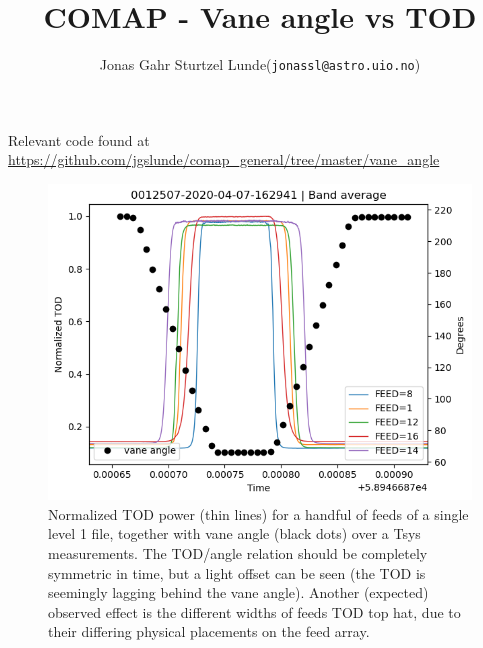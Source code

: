 \documentclass[10pt, a4paper]{article}
\begin{document}
\title{COMAP - Vane angle vs TOD}
\author{
    \begin{tabular}{r l}
        Jonas Gahr Sturtzel Lunde & (\texttt{jonassl@astro.uio.no})
    \end{tabular}}
\maketitle
Relevant code found at \url{https://github.com/jgslunde/comap_general/tree/master/vane_angle}
\vspace{0.7cm}


\begin{figure}[h!]
    \centering
    \includegraphics[scale=0.6]{../tod_angle.png}
    \caption{Normalized TOD power (thin lines) for a handful of feeds of a single level 1 file, together with vane angle (black dots) over a Tsys measurements. The TOD/angle relation should be completely symmetric in time, but a light offset can be seen (the TOD is seemingly lagging behind the vane angle). Another (expected) observed effect is the different widths of feeds TOD top hat, due to their differing physical placements on the feed array.}
    \label{fig:tod_angle}
\end{figure}
\end{document}
